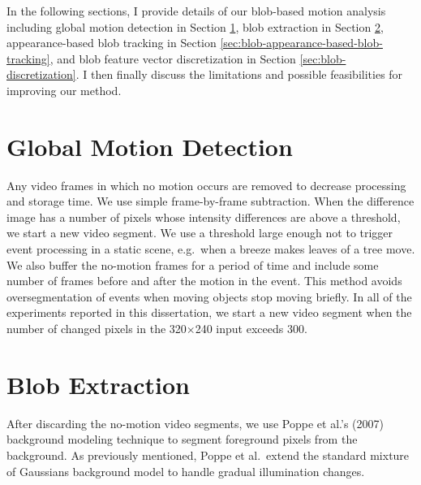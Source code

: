 In the following sections, I provide details of our blob-based motion
analysis including global motion detection in
Section \ref{sec:blob-motion-detection}, blob extraction in
Section \ref{sec:blob-blob-extraction}, appearance-based blob tracking
in Section \ref{sec:blob-appearance-based-blob-tracking}, and blob
feature vector discretization in
Section \ref{sec:blob-discretization}. I then finally discuss the
limitations and possible feasibilities for improving our method.

\section{Global Motion Detection}
\label{sec:blob-motion-detection}

Any video frames in which no motion occurs are removed to decrease
processing and storage time. We use simple frame-by-frame
subtraction. When the difference image has a number of pixels whose
intensity differences are above a threshold, we start a new video
segment. We use a threshold large enough not to trigger event
processing in a static scene, e.g.\ when a breeze makes leaves of a
tree move. We also buffer the no-motion frames for a period of time
and include some number of frames before and after the motion in the
event. This method avoids oversegmentation of events when moving
objects stop moving briefly.  In all of the experiments reported in
this dissertation, we start a new video segment when the number of
changed pixels in the 320$\times$240 input exceeds 300.

\DIFaddbegin {}

\DIFaddend \section{Blob Extraction}
\label{sec:blob-blob-extraction}

After discarding the no-motion video segments, we use Poppe et al.'s
(2007) background modeling technique\nocite{poppe07background} to
segment foreground pixels from the background. As previously
mentioned, Poppe et al.\ extend the standard mixture of Gaussians
background model
 to handle gradual illumination changes.

